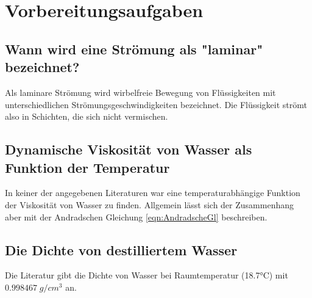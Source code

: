 \section{Vorbereitungsaufgaben}
\label{sec:Vorbereitungsaufgaben}

\subsection{Wann wird eine Strömung als "laminar" bezeichnet?}
    Als laminare Strömung  wird wirbelfreie Bewegung von Flüssigkeiten mit unterschiedlichen Strömungsgeschwindigkeiten bezeichnet. Die Flüssigkeit strömt also in Schichten, die sich nicht vermischen.
    
\subsection{Dynamische Viskosität von Wasser als Funktion der Temperatur}
    In keiner der angegebenen Literaturen war eine temperaturabhängige Funktion der Viskosität von Wasser zu finden. Allgemein lässt sich der Zusammenhang aber mit der Andradschen 
    Gleichung \eqref{eqn:AndradscheGl} beschreiben.

\subsection{Die Dichte von destilliertem Wasser} \label{wasserdichte}
    Die Literatur gibt die Dichte von Wasser bei Raumtemperatur (18.7°C) mit $0.998467 \;\unit{g/cm^3}$ an.